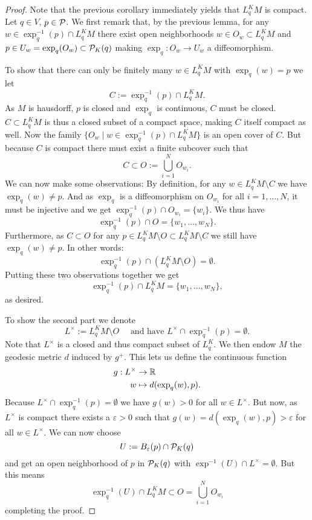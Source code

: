 \begin{proof}
    Note that the previous corollary immediately yields that $L^K_qM$ is compact.
    Let $q\in V$, $p\in {\mathcal{P}}$. We first remark that, by the previous lemma, for any $w\in \exp^{-1}_q(p) \cap L^K_qM$ there exist open neighborhoods $w\in O_w\subset L^K_qM$ and $p\in U_w=\exp_q(O_w)\subset {\mathcal{P}}_K(q)$ making $\exp_q:O_w\to U_w$ a diffeomorphism.

    To show that there can only be finitely many $w\in L^K_qM$ with $\exp_q(w)=p$ we let
    \[
        C:=\exp_q^{-1}(p)\cap L^K_qM.
    \] 
    As $M$ is hausdorff, ${p}$ is closed and $\exp_q$ is continuous, $C$ must be closed. $C\subset L^K_qM$ is thus a closed subset of a compact space, making $C$ itself compact as well. Now the family $\{O_w \mid w\in \exp^{-1}_q(p)\cap L^K_qM\}$ is an open cover of $C$. But because $C$ is compact there must exist a finite subcover such that 
    \[
        C\subset O:= \bigcup_{i=1}^N O_{w_i}.
    \]
    We can now make some observations: By definition, for any $w\in L^K_qM\setminus C$ we have $\exp_q(w)\neq p$. And as $\exp_q$ is a diffeomorphism on $O_{w_i}$ for all $i=1,\dots, N$, it must be injective and we get $\exp^{-1}_q(p)\cap O_{w_i}=\{w_i\}$. We thus have 
    \[
        \exp_q^{-1}(p) \cap O = \{w_1,\dots, w_N\}.
    \]
    Furthermore, as $C\subset O$ for any $p\in L^K_qM\setminus O \subset L^K_qM \setminus C$ we still have $\exp_q(w)\neq p$. In other words: 
    \[
        \exp_q^{-1}(p)\cap (L^K_qM\setminus O)=\emptyset.
    \]
    Putting these two observations together we get 
    \[
        \exp_q^{-1}(p)\cap L^K_qM = \{w_1,\dots, w_N\},
    \]
    as desired.

    To show the second part we denote
    \[
        L^\times := L^K_qM \setminus O \quad \text{ and have } L^\times \cap \exp^{-1}_q(p) = \emptyset.
    \]
    Note that $L^\times$ is a closed and thus compact subset of $L^K_q$. We then endow $M$ the geodesic metric $d$ induced by $g^+$. 
    This lets us define the continuous function 
    \begin{align*}
        g:L^\times &\to \mathbb{R}\\
        w &\mapsto d(\exp_q(w),p).
    \end{align*}
    Because $L^\times \cap \exp^{-1}_q(p) = \emptyset$ we have $g(w)>0$ for all $w\in L^\times$. But now, as $L^\times$ is compact there exists a $\varepsilon>0$ such that $g(w)=d(\exp_q(w),p)>\varepsilon$ for all $w\in L^\times$. We can now choose
    \[
        U := B_\varepsilon(p) \cap {\mathcal{P}}_K(q)
    \] and get an open neighborhood of $p$ in ${\mathcal{P}}_K(q)$ with $\exp^{-1}(U)\cap L^\times = \emptyset$. But this means 
    \[
        \exp^{-1}_q(U) \cap L^K_qM \subset O = \bigcup_{i=1}^N O_{w_i}
    \]
    completing the proof.
\end{proof}


